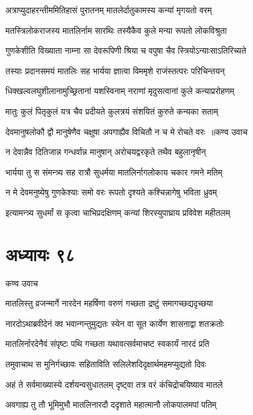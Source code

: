 \twolineshloka
{अत्राप्युदाहरन्तीममितिहासं पुरातनम्}
{मातलेर्दातुकामस्य कन्यां मृगयतो वरम्}


\twolineshloka
{मतस्त्रिलोकराजस्य मातलिर्नाम सारथिः}
{तस्यैकैव कुले मन्या रूपतो लोकविश्रुता}


\twolineshloka
{गुणकेशीति विख्याता नाम्ना सा देवरूपिणी}
{श्रिया च वपुषा चैव स्त्रियोऽन्याःसाऽतिरिच्यते}


\twolineshloka
{तस्याः प्रदानसमयं मातलिः सह भार्यया}
{ज्ञात्वा विममृशे राजंस्तत्परः परिचिन्तयन्}


\twolineshloka
{धिक्खल्वलघुशीलानामुच्छ्रितानां यशस्विनाम्}
{नराणां मृदुसत्वानां कुले कन्याप्ररोहणम्}


\twolineshloka
{मातुः कुलं पितृकुलं यत्र चैव प्रदीयते}
{कुलत्रयं संशयितं कुरुते कन्यका सताम्}


\threelineshloka
{देवमानुषलोकौ द्वौ मानुषेणैव चक्षुषा}
{अपगाह्यैव विचितौ न च मे रोचते वरः ॥कण्व उवाच}
{}


\twolineshloka
{न देवान्नैव दितिजान्न गन्धर्वान्न मानुषान्}
{अरोचयद्वरकृते तथैव बहुलानृषीन्}


\twolineshloka
{भार्यया तु स संमन्त्र्य सह रात्रौ सुधर्मया}
{मातलिर्नागलोकाय चकार गमने मतिम्}


\twolineshloka
{न मे देवमनुष्येषु गुणकेश्याः समो वरः}
{रूपतो दृश्यते कश्चिन्नागेषु भविता ध्रुवम्}


\twolineshloka
{इत्यामन्त्र्य सुधर्मां स कृत्वा चाभिप्रदक्षिणम्}
{कन्यां शिरस्युपाघ्राय प्रविवेश महीतलम्}


\chapter{अध्यायः ९८}
\twolineshloka
{कण्व उवाच}
{}


\twolineshloka
{मातलिस्तु व्रजन्मार्गे नारदेन महर्षिणा}
{वरुणं गच्छता द्रष्टुं समागच्छद्यदृच्छया}


\twolineshloka
{नारदोऽथाब्रवीदेनं क्व भवान्गन्तुमुद्यतः}
{स्येन वा सूत कार्येण शासनाद्वा शतक्रतोः}


\twolineshloka
{मातलिर्नारदेनैवं संपृष्टः पथि गच्छता}
{यथावत्सर्वमाचष्ट स्वकार्यं नारदं प्रति}


\twolineshloka
{तमुवाचाथ स मुनिर्गच्छावः सहिताविति}
{सलिलेशदिदृक्षार्थमहमप्युद्यतो दिवः}


\twolineshloka
{अहं ते सर्वमाख्यास्ये दर्शयन्वसुधातलम्}
{दृष्ट्वा तत्र वरं कंचिद्रोचयिष्याव मातले}


\twolineshloka
{अवगाह्य तु तौ भूमिमुभौ मातलिनारदौ}
{ददृशाते महात्मानौ लोकपालमपां पतिम्}


